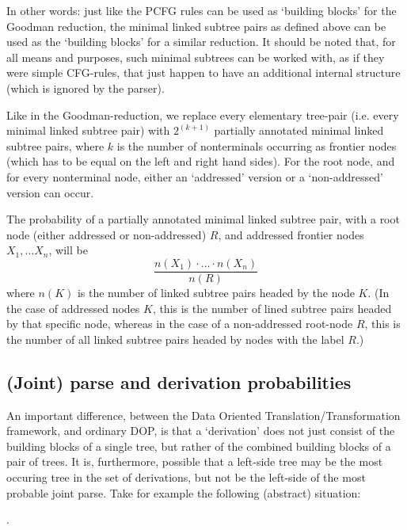 \documentclass[a4paper]{article}
\theoremstyle{definition}
\begin{document}
In other words: just like the PCFG rules can be used as `building blocks'
for the Goodman reduction, the minimal linked subtree pairs as defined above
can be used as the `building blocks' for a similar reduction. It should be
noted that, for all means and purposes, such minimal subtrees can be worked
with, as if they were simple CFG-rules, that just happen to have an additional
internal structure (which is ignored by the parser).

Like in the Goodman-reduction, we replace every elementary tree-pair (i.e. every
minimal linked subtree pair) with $2^{(k+1)}$ partially annotated minimal linked subtree pairs,
where $k$ is the
number of nonterminals occurring as frontier nodes (which has to be equal on the
left and right hand sides). For the root node, and for every nonterminal node,
either an `addressed' version or a `non-addressed' version can occur.

The probability of a partially annotated minimal linked subtree pair, with a root node (either addressed
or non-addressed) $R$, and addressed frontier nodes $X_1, \ldots X_n$, will be
\begin{displaymath}
\frac{n(X_1) \cdot \ldots \cdot n(X_n)}{n(R)}
\end{displaymath}
where $n(K)$ is the number of linked subtree pairs headed by the node $K$. (In the case of addressed nodes $K$, this is the number of lined subtree pairs headed by that specific node, whereas in the case of a non-addressed root-node $R$, this is the number of all linked subtree pairs headed by nodes with the label $R$.)

\subsection{(Joint) parse and derivation probabilities}

An important difference, between the Data Oriented Translation/Transformation framework, and ordinary DOP, is that a `derivation' does not just consist of the building blocks of a single tree, but rather of the combined building blocks of a pair of trees. It is, furthermore, possible that a left-side tree may be the most occuring tree in the set of derivations, but not be the left-side of the most probable joint parse. Take for example the following (abstract) situation:

\ex. \label{abstractexample}
\end{document}
